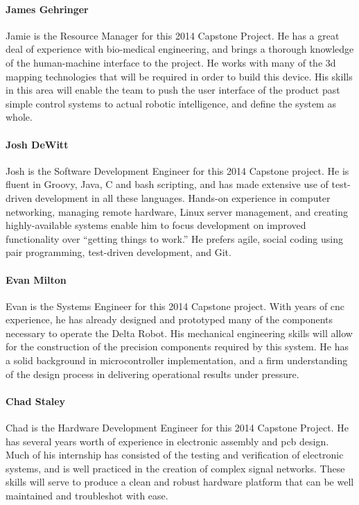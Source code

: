 \paragraph{James Gehringer}
Jamie is the Resource Manager for this 2014 Capstone Project. He has a great deal of experience with bio-medical engineering, and brings a thorough knowledge of the human-machine interface to the project.
He works with many of the \gls{3d} mapping technologies that will be required in order to build this device.
His skills in this area will enable the team to push the user interface of the product past simple control systems to actual robotic intelligence, and define the system as whole.

\paragraph{Josh DeWitt}
Josh is the Software Development Engineer for this 2014 Capstone project.
He is fluent in Groovy, Java, C and bash scripting, and has made extensive use of test-driven development in all these languages.
Hands-on experience in computer networking, managing remote hardware, Linux server management, and creating highly-available systems enable him to focus development on improved functionality over “getting things to work.”
He prefers agile, social coding using pair programming, test-driven development, and Git. 

\paragraph{Evan Milton}
Evan is the Systems Engineer for this 2014 Capstone project.
With years of \gls{cnc} experience, he has already designed and prototyped many of the components necessary to operate the Delta Robot.
His mechanical engineering skills will allow for the construction of the precision components required by this system.
He has a solid background in microcontroller implementation, and a firm understanding of the design process in delivering operational results under pressure.

\paragraph{Chad Staley}
Chad is the Hardware Development Engineer for this 2014 Capstone Project.
He has several years worth of experience in electronic assembly and \gls{pcb} design.
Much of his internship has consisted of the testing and verification of electronic systems, and is well practiced in the creation of complex signal networks.
These skills will serve to produce a clean and robust hardware platform that can be well maintained and troubleshot with ease.

